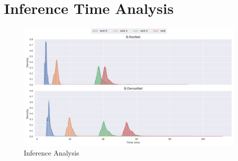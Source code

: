 %
%
%

\section{Inference Time Analysis}

\begin{figure}
	\captionsetup[subfigure]{justification=centering}
	\centering
	\includegraphics[width=\linewidth]{figures/threshold_plots/timing}
	\caption[Inference Analysis]{Inference Analysis}
\end{figure}

